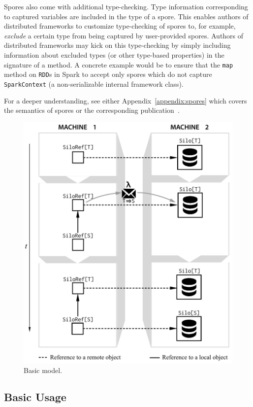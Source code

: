 \documentclass[preprint]{sigplanconf}
\theoremstyle{definition}
\theoremstyle{definition}
\begin{document}
Spores also come with additional type-checking. Type information corresponding
to captured variables are included in the type of a spore. This enables
authors of distributed frameworks to customize type-checking of spores to, for
example, {\em exclude} a certain type from being captured by user-provided
spores. Authors of distributed frameworks may kick on this type-checking by
simply including information about excluded types (or other type-based
properties) in the signature of a method. A concrete example would be to
ensure that the \verb|map| method on \verb|RDD|s in Spark to accept only
spores which do not capture \verb|SparkContext| (a non-serializable internal
framework class).

For a deeper understanding, see either Appendix~\ref{appendix:spores} which
covers the semantics of spores or the corresponding publication~\cite{Spores}.

\begin{figure}[t!]
\includegraphics[width=\columnwidth]{basic-diagram.pdf}
\caption{Basic model.}\label{fig:basic-diagram}
\end{figure}

\subsection{Basic Usage}
\end{document}
